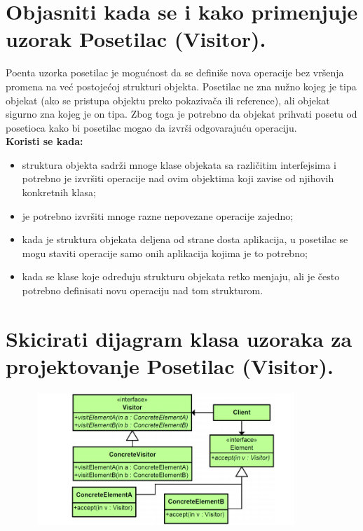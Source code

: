 \documentclass[a4paper]{article}
\begin{document}
\section{Objasniti kada se i kako primenjuje uzorak Posetilac (Visitor).}
  Poenta uzorka posetilac je mogućnost da se definiše nova operacije bez vršenja promena na
  već postojećoj strukturi objekta. Posetilac ne zna nužno kojeg je tipa objekat (ako se 
  pristupa objektu preko pokazivača ili reference), ali objekat sigurno zna kojeg je on tipa. Zbog toga je potrebno
  da objekat prihvati posetu od posetioca kako bi posetilac mogao da izvrši odgovarajuću operaciju.\\
  \textbf{Koristi se kada:}
  \begin{itemize}
    \item struktura objekta sadrži mnoge klase objekata sa različitim interfejsima i potrebno 
          je izvršiti operacije nad ovim objektima koji zavise od njihovih konkretnih klasa;
    \item je potrebno izvršiti mnoge razne nepovezane operacije zajedno;
    \item kada je struktura objekata deljena od strane dosta aplikacija, u posetilac se mogu
          staviti operacije samo onih aplikacija kojima je to potrebno;
    \item kada se klase koje određuju strukturu objekata retko menjaju, ali je često potrebno
          definisati novu operaciju nad tom strukturom.
  \end{itemize}

\section{Skicirati dijagram klasa uzoraka za projektovanje Posetilac (Visitor).}
  \begin{figure}[H]
    \begin{center}
        \includegraphics[width=100mm,height=50mm]{Slike/dp_visitor.png}
    \end{center}
  \end{figure} 
\end{document}

